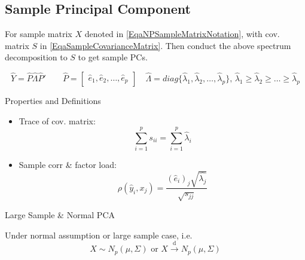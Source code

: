     
\subsection{Sample Principal Component}
    For sample matrix $ X $ denoted in \autoref{EqaNPSampleMatrixNotation}, with cov. matrix $ S $ in \autoref{EqaSampleCovarianceMatrix}. Then conduct the above spectrum decomposition to $ S $ to get sample PCs.

    
    \begin{equation}
        \hat{Y}=\hat{P}\hat{\Lambda }\hat{P}' \qquad \hat{P}=\begin{bmatrix}
            \hat{e}_1,\hat{e}_2,\ldots,\hat{e}_p
        \end{bmatrix} 
        \quad \hat{\Lambda} =diag\{\hat{\lambda} _1,\hat{\lambda} _2,\ldots,\hat{\lambda} _p\},\, \hat{\lambda} _1\geq\hat{\lambda} _2\geq\ldots\geq\hat{\lambda} _p
    \end{equation}
    
    Properties and Definitions 
    \begin{itemize}[topsep=2pt,itemsep=2pt]
        \item Trace of cov. matrix:
        \begin{equation}
            \sum_{i=1}^ps _{ii}=\sum_{i=1}^p\hat{\lambda}_i
        \end{equation}
        
        
        \item Sample corr \& factor load:
        \begin{equation}
             \rho (\hat{y}_i,x_j)=\dfrac{(\hat{e}_{i})_j\sqrt{\hat{\lambda _j}}}{\sqrt{s_{jj}}}
        \end{equation}
    \end{itemize}
    
    \begin{point}
        Large Sample \& Normal PCA
    \end{point}
    
    Under normal assumption or large sample case, i.e. 
    \begin{equation}
        X\sim N_p(\mu,\Sigma ) \text{ or } X\xrightarrow[]{\mathrm{d}} N_p(\mu,\Sigma )
    \end{equation}
    
